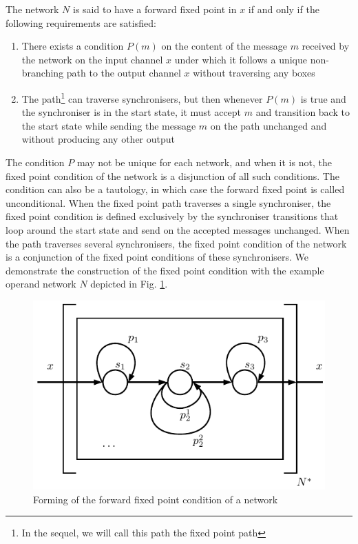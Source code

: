 \begin{definition}\label{ffp_def}The network $N$ is said to have a forward fixed point in $x$ if and only if the following requirements are satisfied:
\begin{enumerate}
\item There exists a condition $P(m)$ on the content of the message $m$ received by the network on the input channel $x$ under which it follows a unique non-branching path to the output channel $x$ without traversing any boxes
\item The path\footnote{In the sequel, we will call this path the fixed point path} can traverse synchronisers, but then whenever $P(m)$ is true and the synchroniser is in the start state, it must accept $m$ and transition back to the start state while sending the message $m$ on the path unchanged and without producing any other output
\end{enumerate}
\end{definition}

The condition $P$ may not be unique for each network, and when it is not, the fixed point condition of the network is a disjunction of all such conditions. The condition can also be a tautology, in which case the forward fixed point is called unconditional. When the fixed point path traverses a single synchroniser, the fixed point condition is defined exclusively by the synchroniser transitions that loop around the start state and send on the accepted messages unchanged. When the path traverses several synchronisers, the fixed point condition of the network is a conjunction of the fixed point conditions of these synchronisers. We demonstrate the construction of the fixed point condition with the example operand network $N$ depicted in Fig. \ref{fig:ffp}.

\begin{figure}[h!]
\centering
\includegraphics[scale=0.8]{figs/chapter_04_ffp.pdf}
\caption{Forming of the forward fixed point condition of a network}
\label{fig:ffp}
\end{figure}

